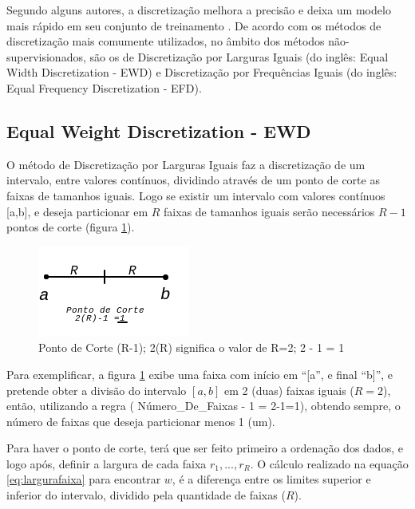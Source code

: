 Segundo alguns autores, a discretização melhora a precisão e deixa um modelo mais rápido em seu conjunto de treinamento \cite{Catlett2006b,Hwang2002}. De acordo com  os métodos de discretização mais comumente utilizados, no âmbito dos métodos  não-supervisionados,  são os de Discretização por Larguras Iguais (do inglês: Equal Width Discretization - EWD) e Discretização por Frequências Iguais (do inglês: Equal Frequency Discretization - EFD).




\subsection{Equal Weight Discretization - EWD}\label{cap:refTeor:subsec:ewd}

O método de Discretização por Larguras Iguais faz a discretização de um intervalo, entre valores contínuos, dividindo através de um ponto de corte as faixas de tamanhos iguais. Logo se existir um intervalo com valores contínuos [a,b], e deseja particionar em ${R}$ faixas de tamanhos iguais serão necessários ${R-1}$ pontos de corte (figura \ref{fig:pontocorte}). 

\begin{figure}[h]
        \centering
        \includegraphics[scale=1]{figs/faixaA-B_PontoCorte.png}
        \caption{Ponto de Corte (R-1); 2(R) significa o valor de R=2; 2 - 1 = 1} \label{fig:pontocorte}
\end{figure}

Para exemplificar, a figura \ref{fig:pontocorte} exibe uma faixa com início em ``[a'', e final ``b]'', e pretende obter a divisão do intervalo ${[a,b]}$ em 2 (duas) faixas iguais (${R=2}$), então, utilizando a regra ( Número\_De\_Faixas - 1 =  2-1=1), obtendo sempre, o número de faixas que deseja particionar menos 1 (um).

Para haver o ponto de corte, terá que ser feito primeiro a ordenação dos dados, e logo após, definir a largura de cada faixa ${r_1,...,r_R}$. O cálculo realizado na equação \ref{eq:largurafaixa} para encontrar ${w}$, é a diferença entre os limites superior e inferior do intervalo, dividido pela quantidade de faixas (${R}$).

